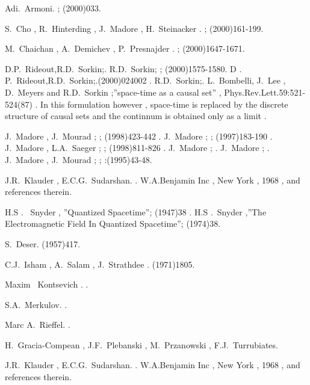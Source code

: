 \documentclass[a4paper,12pt]{article}
\begin{document}
\begin{thebibliography}{10}
Adi.~Armoni.
;
(2000)033.

S.~Cho , R.~Hinterding , J.~Madore , H.~Steinacker .
;
(2000)161-199.

M.~Chaichan , A.~Demichev , P.~Presnajder .
;
(2000)1647-1671.

D.P.~Rideout,R.D.~Sorkin;.
R.D.~Sorkin; ; (2000)1575-1580. D .
P.~Rideout,R.D.~Sorkin;.(2000)024002 . R.D.~Sorkin;. L.~Bombelli, J.~Lee
, D.~Meyers and R.D.~Sorkin ;''space-time as a causal set'' , Phys.Rev.Lett.59:521-524(87) . In this formulation however , space-time is replaced by the discrete
structure of causal sets and the continnum is obtained only as a
limit .

J.~Madore , J.~Mourad ;  ;
(1998)423-442 . J.~Madore ;
 ; (1997)183-190 . J.~Madore ,
L.A.~Saeger ;  ; (1998)811-826 . J.~Madore ;
. J.~Madore ; . J.~Madore , J.~Mourad ;  ;
:(1995)43-48.

J.R.~Klauder , E.C.G.~Sudarshan.
.
\newblock W.A.Benjamin Inc , New York , 1968 , and references
therein.

H.S . ~Snyder , ''Quantized Spacetime'';
 (1947)38 .
H.S .~Snyder ,''The Electromagnetic Field In Quantized Spacetime'';
 (1974)38.

S.~Deser.
(1957)417.

C.J.~Isham , A.~Salam , J.~Strathdee . 
(1971)1805.


Maxim ~Kontsevich .
.

S.A.~Merkulov.
.

Marc A.~Rieffel.
.

H.~Gracia-Compean , J.F.~Plebanski , M.~Przanowski ,
F.J.~Turrubiates.



J.R.~Klauder , E.C.G.~Sudarshan.
.
\newblock W.A.Benjamin Inc , New York , 1968 , and references
therein.

\end{thebibliography}
\end{document}
